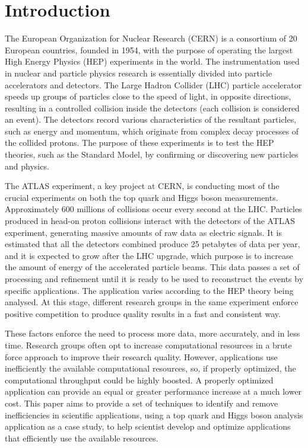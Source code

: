 \section{Introduction}
\label{introduction}

The European Organization for Nuclear Research (CERN) is a consortium of 20 European countries, founded in 1954, with the purpose of operating the largest High Energy Physics (HEP) experiments in the world. The instrumentation used in nuclear and particle physics research is essentially divided into particle accelerators and detectors. The Large Hadron Collider (LHC) particle accelerator speeds up groups of particles close to the speed of light, in opposite directions, resulting in a controlled collision inside the detectors (each collision is considered an event). The detectors record various characteristics of the resultant particles, such as energy and momentum, which originate from complex decay processes of the collided protons. The purpose of these experiments is to test the HEP theories, such as the Standard Model, by confirming or discovering new particles and physics.

The ATLAS experiment, a key project at CERN, is conducting most of the crucial experiments on both the top quark and Higgs boson measurements. Approximately 600 millions of collisions occur every second at the LHC. Particles produced in head-on proton collisions interact with the detectors of the ATLAS experiment, generating massive amounts of raw data as electric signals. It is estimated that all the detectors combined produce 25 petabytes of data per year, and it is expected to grow after the LHC upgrade, which purpose is to increase the amount of energy of the accelerated particle beams. This data passes a set of processing and refinement until it is ready to be used to reconstruct the events by specific applications. The application varies according to the HEP theory being analysed. At this stage, different research groups in the same experiment enforce positive competition to produce quality results in a fast and consistent way.

These factors enforce the need to process more data, more accurately, and in less time. Research groups often opt to increase computational resources in a brute force approach to improve their research quality. However, applications use inefficiently the available computational resources, so, if properly optimized, the computational throughput could be highly boosted. A properly optimized application can provide an equal or greater performance increase at a much lower cost. This paper aims to provide a set of techniques to identify and remove inefficiencies in scientific applications, using a top quark and Higgs boson analysis application as a case study, to help scientist develop and optimize applications that efficiently use the available resources.

